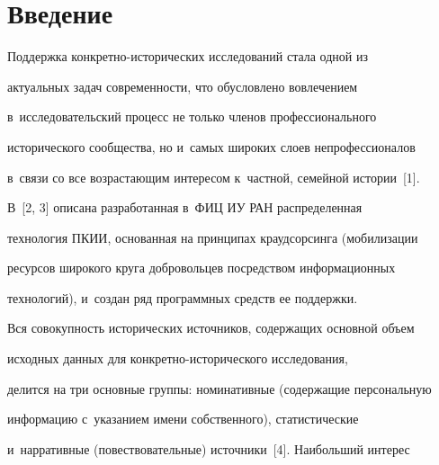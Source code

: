 




 \thispagestyle{headings}


 


 \vspace*{-8pt}


  


\section{Введение}





\vspace*{-2pt}





  Поддержка конкретно-исторических исследований стала одной из 


актуальных задач современности, что обусловлено вовлечением 


в~исследовательский процесс не только членов профессионального 


исторического сообщества, но и~самых широких слоев непрофессионалов 


в~связи со все возрастающим интересом к~частной, семейной истории~[1].


  


  В~[2, 3] описана разработанная в~ФИЦ ИУ РАН распределенная 


технология ПКИИ, основанная на принципах краудсорсинга (мобилизации 


ресурсов широкого круга добровольцев посредством информационных 


технологий), и~создан ряд программных средств ее поддержки. 


  


  Вся совокупность исторических источников, содержащих основной объем 


исходных данных для кон\-крет\-но-ис\-то\-ри\-че\-ско\-го исследования, 


делится на три основные группы: номинативные (содержащие персональную 


информацию с~указанием имени собственного), статистические 


и~нарративные (повествовательные) источники~[4]. Наибольший интерес 


